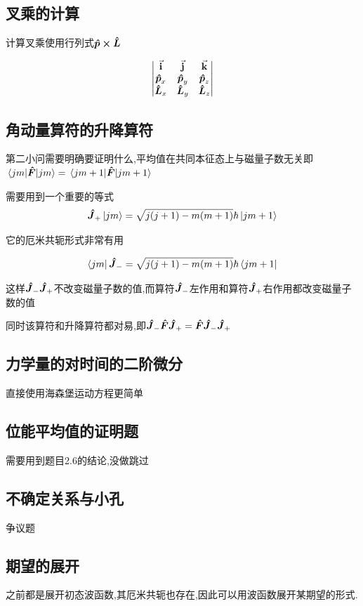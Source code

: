 \documentclass{article}
\begin{document}
        \subsection{叉乘的计算}
            \begin{formal}
                计算叉乘使用行列式$ \vu*{p} \cross \vu*{L} $

                $$ \mqty| \va{i} & \va{j} & \va{k} \\ \vu*{p}_{x} & \vu*{p}_{y} & \vu*{p}_{z} \\ \vu*{L}_{x} & \vu*{L}_{y} & \vu*{L}_{z} | $$
            \end{formal}
            

        \subsection{角动量算符的升降算符}
            第二小问需要明确要证明什么,平均值在共同本征态上与磁量子数无关即$ \ev{\vu*{F}}{jm}  = \ev{\vu*{F}}{jm+1}$

            需要用到一个重要的等式
            $$ \vu*{J}_{+} \ket{jm} = \sqrt{j(j+1)-m(m+1)} \hbar \ket{jm+1} $$

            它的厄米共轭形式非常有用

            $$ \bra{jm} \vu*{J}_{-} = \sqrt{j(j+1)-m(m+1)} \hbar \bra{jm+1} $$

            这样$\vu*{J}_{-} \vu*{J}_{+}$不改变磁量子数的值,而算符$\vu*{J}_{-}$左作用和算符$\vu*{J}_{+}$右作用都改变磁量子数的值 

            同时该算符和升降算符都对易,即$ \vu*{J}_{-} \vu*{F} \vu*{J}_{+} = \vu*{F} \vu*{J}_{-} \vu*{J}_{+} $

        \subsection{力学量的对时间的二阶微分}
            直接使用海森堡运动方程更简单

        \subsection{位能平均值的证明题}
            需要用到题目2.6的结论,没做跳过

        \subsection{不确定关系与小孔}
            争议题
        \subsection{期望的展开}
            之前都是展开初态波函数,其厄米共轭也存在,因此可以用波函数展开某期望的形式.
\end{document}
